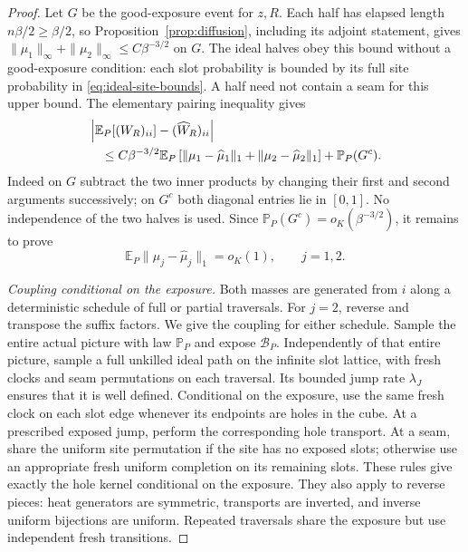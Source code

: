 \begin{proof}
Let \(G\) be the good-exposure event for \(z,R\). Each half has
elapsed length \(n\beta/2\ge\beta/2\), so
Proposition~\ref{prop:diffusion}, including its adjoint statement,
gives \(\|\mu_1\|_\infty+\|\mu_2\|_\infty\le C\beta^{-3/2}\)
on \(G\). The ideal halves obey this bound without a good-exposure
condition: each slot probability is bounded by its full site
probability in \eqref{eq:ideal-site-bounds}. A half need not contain
a seam for this upper bound. The elementary pairing inequality gives
\begin{align}
 &\left|\mathbb E_P[(W_R)_{ii}]-(\widehat W_R)_{ii}\right|\notag\\
 &\quad\le C\beta^{-3/2}\mathbb E_P
    \left[\|\mu_1-\widehat\mu_1\|_1+
          \|\mu_2-\widehat\mu_2\|_1\right]
       +\mathbb P_P(G^c).\label{eq:midpoint-reduction}
\end{align}
Indeed on \(G\) subtract the two inner products by changing their
first and second arguments successively; on \(G^c\) both diagonal
entries lie in \([0,1]\). No independence of the two halves is used.
Since \(\mathbb P_P(G^c)=o_K(\beta^{-3/2})\), it remains to prove
\begin{equation}\label{eq:coupling-l1}
 \mathbb E_P\|\mu_j-\widehat\mu_j\|_1=o_K(1),\qquad j=1,2.
\end{equation}

\medskip\noindent
\emph{Coupling conditional on the exposure.}
Both masses are generated from \(i\) along a deterministic schedule
of full or partial traversals. For \(j=2\), reverse and transpose the
suffix factors. We give the coupling for either schedule. Sample the
entire actual picture with law \(\mathbb P_P\) and expose
\(\mathcal B_P\). Independently of that entire picture, sample a
full unkilled ideal path on the infinite slot lattice, with fresh
clocks and seam permutations on each traversal. Its bounded jump rate
\(\lambda_J\) ensures that it is well defined. Conditional on the
exposure, use the same fresh clock on each slot edge whenever its
endpoints are holes in the cube. At a prescribed exposed jump, perform
the corresponding hole transport. At a seam, share the uniform site
permutation if the site has no exposed slots; otherwise use an
appropriate fresh uniform completion on its remaining slots. These
rules give exactly the hole kernel conditional on the exposure. They
also apply to reverse pieces: heat generators are symmetric, transports
are inverted, and inverse uniform bijections are uniform. Repeated
traversals share the exposure but use independent fresh transitions.


\end{proof}
